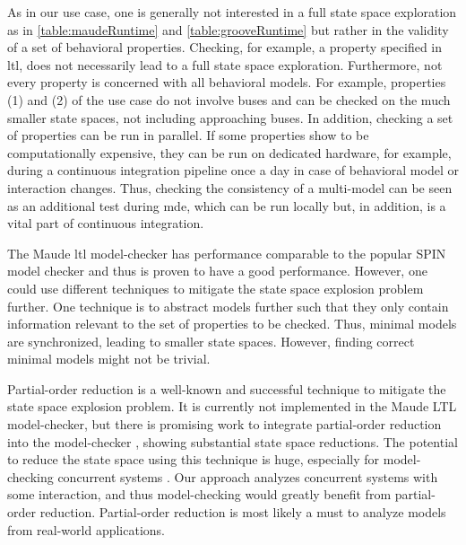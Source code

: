 \documentclass{jot}
\begin{document}
As in our use case, one is generally not interested in a full state space exploration as in \autoref{table:maudeRuntime} and \autoref{table:grooveRuntime} but rather in the validity of a set of behavioral properties.
Checking, for example, a property specified in \gls*{ltl}, does not necessarily lead to a full state space exploration.
Furthermore, not every property is concerned with all behavioral models.
For example, properties (1) and (2) of the use case do not involve buses and can be checked on the much smaller state spaces, not including approaching buses.
In addition, checking a set of properties can be run in parallel.
If some properties show to be computationally expensive, they can be run on dedicated hardware, for example, during a continuous integration pipeline once a day in case of behavioral model or interaction changes.
Thus, checking the consistency of a multi-model can be seen as an additional test during \gls*{mde}, which can be run locally but, in addition, is a vital part of continuous integration.

The Maude \gls*{ltl} model-checker has performance comparable to the popular SPIN model checker \cite{ekerMaudeLTLModel2004} and thus is proven to have a good performance.
However, one could use different techniques to mitigate the state space explosion problem further.
One technique is to abstract models further such that they only contain information relevant to the set of properties to be checked.
Thus, minimal models are synchronized, leading to smaller state spaces.
However, finding correct minimal models might not be trivial.

Partial-order reduction is a well-known and successful technique to mitigate the state space explosion problem.
It is currently not implemented in the Maude LTL model-checker, but there is promising work to integrate partial-order reduction into the model-checker \cite{farzanPartialOrderReduction2007}, showing substantial state space reductions.
The potential to reduce the state space using this technique is huge, especially for model-checking concurrent systems \cite{clarkeHandbookModelChecking2018}.
Our approach analyzes concurrent systems with some interaction, and thus model-checking would greatly benefit from partial-order reduction.
Partial-order reduction is most likely a must to analyze models from real-world applications.
\end{document}
